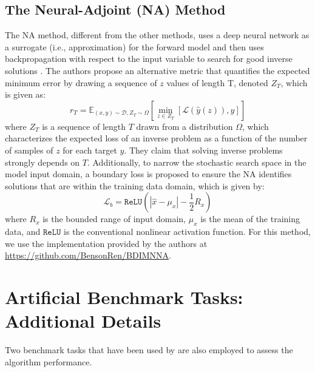 \documentclass[letterpaper]{article} %
\begin{document}
\subsection{The Neural-Adjoint (NA) Method}
The NA method, different from the other methods, uses a deep neural network as a surrogate (i.e., approximation) for the forward model and then uses backpropagation with respect to the input variable to search for good inverse solutions \cite{ren2020benchmarking}. The authors \cite{ren2020benchmarking} propose an alternative metric that quantifies the expected minimum error by drawing a sequence of $z$ values of length T, denoted $Z_T$, which is given as:
\begin{equation}
    r_T = \mathbb{E}_{(x,y) \sim \mathcal{D}, Z_T \sim \Omega} \left[ \min_{z \in Z_T} [ \mathcal{L}(\hat{y}(z)),y]\right]
\end{equation}
where $Z_T$ is a sequence of length $T$ drawn from a distribution $\Omega$, which characterizes the expected loss of an inverse problem as a function of the number of samples of $z$ for each target $y$. They claim that solving inverse problems strongly depends on $T$. Additionally, to narrow the stochastic search space in the model input domain, a boundary loss is proposed to ensure the NA identifies solutions that are within the training data domain, which is given by:
\begin{equation}
    \mathcal{L}_b = \texttt{ReLU}(|\hat{x} - \mu_x| - \frac{1}{2}R_x)
\end{equation}
where $R_x$ is the bounded range of input domain, $\mu_x$ is the mean of the training data, and $\texttt{ReLU}$ is the conventional nonlinear activation function. For this method, we use the implementation provided by the authors \cite{ren2020benchmarking} at \url{https://github.com/BensonRen/BDIMNNA}. 


\section{Artificial Benchmark Tasks: Additional Details}
Two benchmark tasks that have been used by \citep{ardizzone2018analyzing,ren2020benchmarking, kruse2021benchmarking} are also employed to assess the algorithm performance. 
\end{document}
